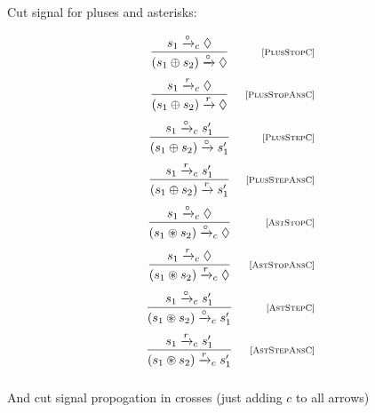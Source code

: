 Cut signal for pluses and asterisks:

  \[
  \begin{array}{cr}
    \dfrac{s_1 \xrightarrow{\circ}_c \Diamond}{(s_1 \oplus s_2) \xrightarrow{\circ} \Diamond} & \mbox{\scriptsize{[\textsc{PlusStopC}]}}\\[5mm]
    \dfrac{s_1 \xrightarrow{r}_c \Diamond}{(s_1 \oplus s_2) \xrightarrow{r} \Diamond} & \mbox{\scriptsize{[\textsc{PlusStopAnsC}]}}\\[5mm]
    \dfrac{s_1 \xrightarrow{\circ}_c s'_1}{(s_1 \oplus s_2) \xrightarrow{\circ} s'_1} &\mbox{\scriptsize{[\textsc{PlusStepC}]}}\\[5mm]
    \dfrac{s_1 \xrightarrow{r}_c s'_1}{(s_1 \oplus s_2) \xrightarrow{r} s'_1} &\mbox{\scriptsize{[\textsc{PlusStepAnsC}]}}\\[5mm]
    \dfrac{s_1 \xrightarrow{\circ}_c \Diamond}{(s_1 \circledast s_2) \xrightarrow{\circ}_c \Diamond} & \mbox{\scriptsize{[\textsc{AstStopC}]}}\\[5mm]
    \dfrac{s_1 \xrightarrow{r}_c \Diamond}{(s_1 \circledast s_2) \xrightarrow{r}_c \Diamond} & \mbox{\scriptsize{[\textsc{AstStopAnsC}]}}\\[5mm]
    \dfrac{s_1 \xrightarrow{\circ}_c s'_1}{(s_1 \circledast s_2) \xrightarrow{\circ}_c s'_1} &\mbox{\scriptsize{[\textsc{AstStepC}]}}\\[5mm]
    \dfrac{s_1 \xrightarrow{r}_c s'_1}{(s_1 \circledast s_2) \xrightarrow{r}_c s'_1} &\mbox{\scriptsize{[\textsc{AstStepAnsC}]}}\\[5mm]
  \end{array}
  \]
  
And cut signal propogation in crosses (just adding $c$ to all arrows)

